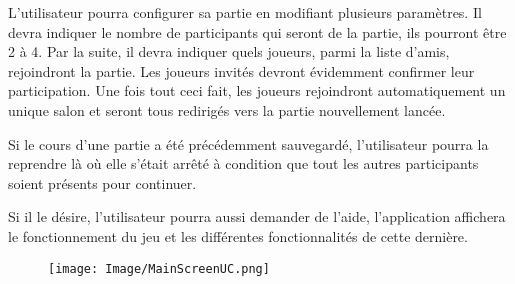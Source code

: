 \documentclass[french, utf8]{article}
\begin{document}
L'utilisateur pourra configurer sa partie en modifiant plusieurs paramètres. Il devra indiquer le nombre de participants qui seront de la partie, ils pourront être 2 à 4. Par la suite, il devra indiquer quels joueurs, parmi la liste d'amis, rejoindront la partie. Les joueurs invités devront évidemment confirmer leur participation. Une fois tout ceci fait, les joueurs rejoindront automatiquement un unique salon et seront tous redirigés vers la partie nouvellement lancée. \newline

Si le cours d'une partie a été précédemment sauvegardé, l'utilisateur pourra la reprendre là où elle s'était arrêté à condition que tout les autres participants soient présents pour continuer.

Si il le désire, l'utilisateur pourra aussi demander de l'aide, l'application affichera le fonctionnement du jeu et les différentes fonctionnalités de cette dernière.


\begin{figure}[ht]
     \centering
    \texttt{[image: Image/MainScreenUC.png]}

\end{figure}
\end{document}
